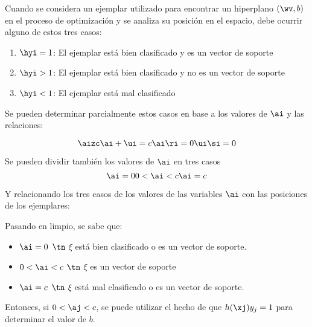 Cuando se considera un ejemplar utilizado para encontrar un hiperplano $(\wv,b)$ en el proceso de optimización y se analiza su posición en el espacio, debe ocurrir alguno de estos tres casos:

\begin{enumerate}
\item $\hyi =1$: El ejemplar está bien clasificado y es un vector de soporte 
\item $\hyi >1$: El ejemplar está bien clasificado y no es un vector de soporte 
\item $\hyi <1$: El ejemplar está mal clasificado
\end{enumerate}



Se pueden determinar parcialmente estos casos en base a los valores de $\ai$ y las relaciones:

\begin{equation*}
\aizc \\
\ai+\ui=c  \\
\ai \ri = 0  \\
\ui \si =0 
\end{equation*}

Se pueden dividir también los valores de $\ai$ en tres casos
\begin{equation*}
\ai =0 \\
0 <\ai < c \\ 
\ai = c
\end{equation*}

Y relacionando los tres casos de los valores de las variables $\ai$ con las posiciones de los ejemplares:


Pasando en limpio, se sabe que:

\begin{itemize}
\item $\ai =0$ $\tn$ $\xi$ está bien clasificado o es un vector de soporte.
\item $0 <\ai < c$ $\tn$ $\xi$ es un vector de soporte
\item $\ai = c$ $\tn$ $\xi$ está mal clasificado o es un vector de soporte.
\end{itemize}
 
Entonces, si $0 <\aj < c$, se puede utilizar el hecho de que $h(\xj) y_j =1 $ para determinar el valor de $b$. 

